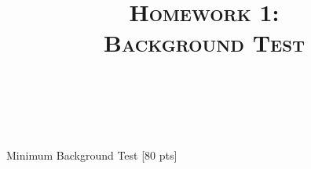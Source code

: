 \documentclass[a4paper]{article}
\title{\textsc{Homework 1: \\ Background Test}} %
\author{
\red{Name: Deepan Das} \\
\red{ID: ddas27}\\
}
\date{}
\theoremstyle{definition}
\begin{document}
\maketitle 


\begin{center}
\Huge
Minimum Background Test [80 pts]
\end{center}
\end{document}
